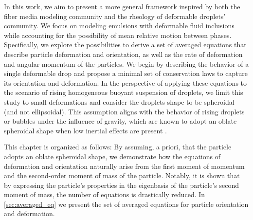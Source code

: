 In this work, we aim to present a more general framework inspired by both the fiber media modeling community and the rheology of deformable droplets' community. 
We focus on modeling emulsions with deformable fluid inclusions while accounting for the possibility of mean relative motion between phases. 
Specifically, we explore the possibilities to derive a set of averaged equations that describe particle deformation and orientation, as well as the rate of deformation and angular momentum of the particles.
We begin by describing the behavior of a single deformable drop and propose a minimal set of conservation laws to capture its orientation and deformation. 
In the perspective of applying these equations to the scenario of rising homogeneous buoyant suspension of droplets,  we limit this study to small deformations and consider the droplets shape to be spheroidal (and not ellipsoidal). 
This assumption aligns with the behavior of rising droplets or bubbles under the influence of gravity, which are known to adopt an oblate spheroidal shape when low inertial effects are present \citep{taylor1964deformation}. 


This chapter is organized as follows:
By assuming, a priori, that the particle adopts an oblate spheroidal shape, we demonstrate how the equations of deformation and orientation naturally arise from the first moment of momentum and the second-order moment of mass of the particle.
Notably, it is shown that by expressing the particle's properties in the eigenbasis of the particle's second moment of mass, the number of equations is drastically reduced.
In \ref{sec:averaged_eq} we present the set of averaged equations for particle orientation and deformation. 

